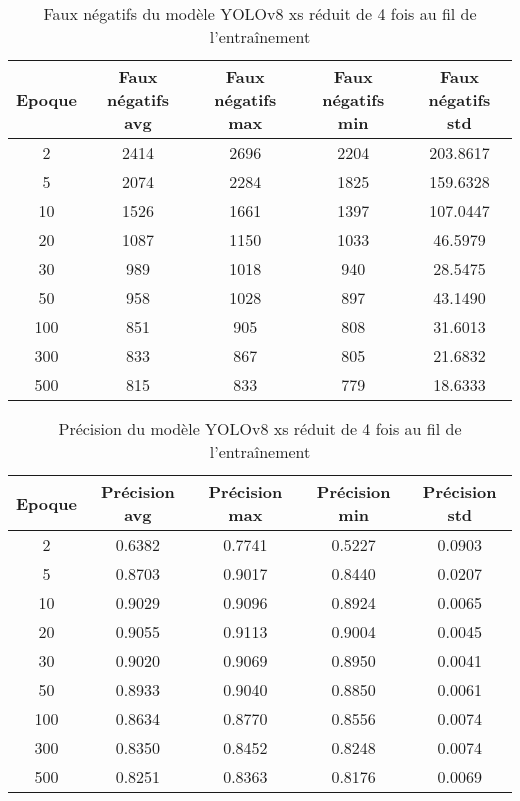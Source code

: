 \begin{table}[!ht]
    \caption{Faux négatifs du modèle YOLOv8 xs réduit de 4 fois au fil de l'entraînement}
    \label{tab:yolov8xs_reduced4x_false_negative}
    \centering
    \begin{tabular}{ |c||c|c|c|c|  }
        \hline
        \rowcolor{gray!50}
        Epoque & Faux négatifs avg & Faux négatifs max & Faux négatifs min & Faux négatifs std\\
        \hline
        2 & 2414 & 2696 & 2204 & 203.8617\\
        5 & 2074 & 2284 & 1825 & 159.6328\\
        10 & 1526 & 1661 & 1397 & 107.0447\\
        20 & 1087 & 1150 & 1033 & 46.5979\\
        30 & 989 & 1018 & 940 & 28.5475\\
        50 & 958 & 1028 & 897 & 43.1490\\
        100 & 851 & 905 & 808 & 31.6013\\
        300 & 833 & 867 & 805 & 21.6832\\
        500 & 815 & 833 & 779 & 18.6333\\
        \hline
    \end{tabular}
\end{table}

\begin{table}[!ht]
    \caption{Précision du modèle YOLOv8 xs réduit de 4 fois au fil de l'entraînement}
    \label{tab:yolov8xs_reduced4x_precision}
    \centering
    \begin{tabular}{ |c||c|c|c|c|  }
        \hline
        \rowcolor{gray!50}
        Epoque & Précision avg & Précision max & Précision min & Précision std\\
        \hline
        2 & 0.6382 & 0.7741 & 0.5227 & 0.0903\\
        5 & 0.8703 & 0.9017 & 0.8440 & 0.0207\\
        10 & 0.9029 & 0.9096 & 0.8924 & 0.0065\\
        20 & 0.9055 & 0.9113 & 0.9004 & 0.0045\\
        30 & 0.9020 & 0.9069 & 0.8950 & 0.0041\\
        50 & 0.8933 & 0.9040 & 0.8850 & 0.0061\\
        100 & 0.8634 & 0.8770 & 0.8556 & 0.0074\\
        300 & 0.8350 & 0.8452 & 0.8248 & 0.0074\\
        500 & 0.8251 & 0.8363 & 0.8176 & 0.0069\\
        \hline
    \end{tabular}
\end{table}

